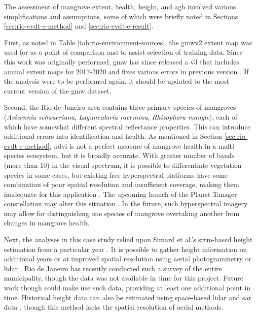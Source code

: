 The assessment of mangrove extent, health, height, and \ac{agb} involved various simplifications and assumptions, some of which were briefly noted in Sections \ref{sec:rio-evdt-e-method} and \ref{sec:rio-evdt-e-result}. 

First, as noted in Table \ref{tab:rio-environment-sources}, the \ac{gmw}v2 extent map was used for as a point of comparison and to assist selection of training data. Since this work was originally performed, \ac{gmw} has since released a v3 that includes annual extent maps for 2017-2020 and fixes various errors in previous version \cite{buntingGlobalMangroveExtent2022}. If the analysis were to be performed again, it should be updated to the most current version of the \ac{gmw} dataset.

Second, the Rio de Janeiro area contains three primary species of mangroves (\textit{Avicennia schaueriana}, \textit{Laguncularia racemosa}, \textit{Rhizophora mangle}), each of which have somewhat different spectral reflectance properties. This can introduce additional errors into identification and health. As mentioned in Section \ref{sec:rio-evdt-e-method}, \ac{ndvi} is not a perfect measure of mangrove health in a multi-species ecosystem, but it is broadly accurate. With greater number of bands (more than 10) in the visual spectrum, it is possible to differentiate vegetation species in some cases, but existing free hyperspectral platforms have some combination of poor spatial resolution and insufficient coverage, making them inadequate for this application \cite{mousivandGlobalSensitivityAnalysis2014}. The upcoming launch of the Planet Tanager constellation may alter this situation \cite{planetlabspbcPlanetAnnouncesNew2022}. In the future, such hyperspectral imagery may allow for distinguishing one species of mangrove overtaking another from changes in mangrove health. 

Next, the analyses in this case study relied upon Simard et al.'s \ac{srtm}-based height estimation from a particular year \cite{simardMangroveCanopyHeight2019}. It is possible to gather height information on additional years or at improved spatial resolution using aerial photogrammetry or \ac{lidar} \cite{olagokeIndividualMangroveTree2015}. Rio de Janeiro has recently conducted such a survey of the entire municipality, though the data was not available in time for this project. Future work though could make use such data, providing at least one additional point in time. Historical height data can also be estimated using space-based \ac{lidar} and \ac{sar} data \cite{lagomasinoComparisonMangroveCanopy2016}, though this method lacks the spatial resolution of aerial methods.

